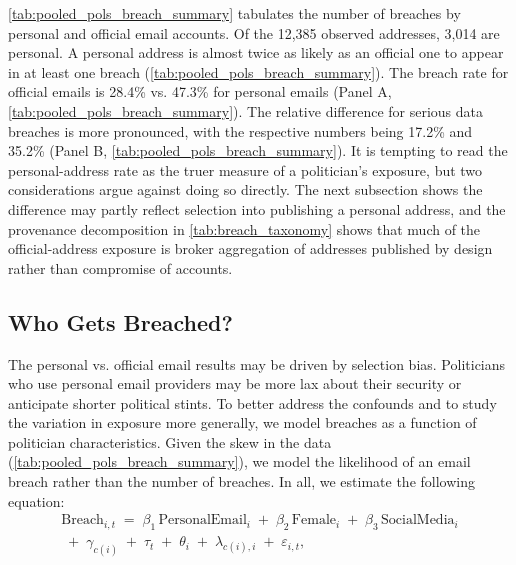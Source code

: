 \documentclass[12pt, letterpaper]{article}
\begin{document}
\cref{tab:pooled_pols_breach_summary} tabulates the number of breaches by personal and official email accounts. Of the 12,385 observed addresses, 3,014 are personal. A personal address is almost twice as likely as an official one to appear in at least one breach (\cref{tab:pooled_pols_breach_summary}). The breach rate for official emails is 28.4\% vs. 47.3\% for personal emails (Panel A, \cref{tab:pooled_pols_breach_summary}). The relative difference for serious data breaches is more pronounced, with the respective numbers being 17.2\% and 35.2\% (Panel B, \cref{tab:pooled_pols_breach_summary}). It is tempting to read the personal-address rate as the truer measure of a politician's exposure, but two considerations argue against doing so directly. The next subsection shows the difference may partly reflect selection into publishing a personal address, and the provenance decomposition in \cref{tab:breach_taxonomy} shows that much of the official-address exposure is broker aggregation of addresses published by design rather than compromise of accounts.

\subsection{Who Gets Breached?}
The personal vs. official email results may be driven by selection bias. Politicians who use personal email providers may be more lax about their security or anticipate shorter political stints. To better address the confounds and to study the variation in exposure more generally, we model breaches as a function of politician characteristics. Given the skew in the data (\cref{tab:pooled_pols_breach_summary}), we model the likelihood of an email breach rather than the number of breaches. In all, we estimate the following equation:
\begin{multline}
\label{eq:breach_lpm}
\text{Breach}_{i,t} \;=\; 
\beta_1\,\text{PersonalEmail}_i
\;+\; \beta_2\,\text{Female}_i 
\;+\; \beta_3\,\text{SocialMedia}_i \\
\;+\; \gamma_{c(i)} 
\;+\; \tau_t
\;+\; \theta_i
\;+\; \lambda_{c(i), i}
\;+\; \varepsilon_{i,t},
\end{multline}
\end{document}
